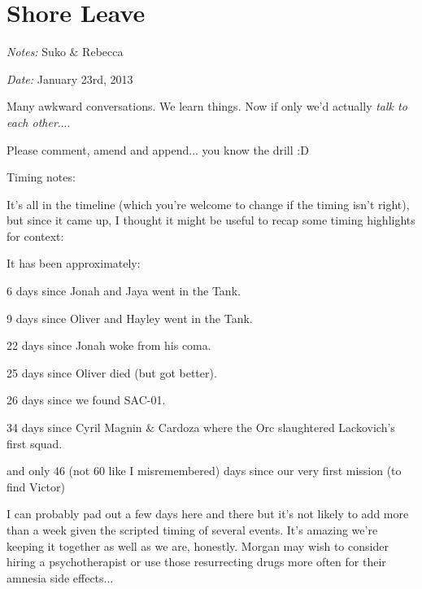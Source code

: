 \setcounter{chapter}{ 13 }
\chapter{\textbf{Shore Leave} }






\textit{Notes:} Suko \& Rebecca

\textit{Date:} January 23rd, 2013



Many awkward conversations.  We learn things.  Now if only we'd actually \textit{talk to each other}....



Please comment, amend and append... you know the drill :D



\noindent\hrulefill



 {\LARGE Timing notes: } 



It's all in the timeline (which you're welcome to change if the timing isn't right), but since it came up, I thought it might be useful to recap some timing highlights for context:



It has been approximately:

6 days since Jonah and Jaya went in the Tank.  

9 days since Oliver and Hayley went in the Tank.

22 days since Jonah woke from his coma.

25 days since Oliver died (but got better).

26 days since we found SAC-01.  

34 days since Cyril Magnin \& Cardoza where the Orc slaughtered Lackovich's first squad. 

and only 46 (not 60 like I misremembered) days since our very first mission (to find Victor)



I can probably pad out a few days here and there but it's not likely to add more than a week given the scripted timing of several events.  It's amazing we're keeping it together as well as we are, honestly.  Morgan may wish to consider hiring a psychotherapist or use those resurrecting drugs more often for their amnesia side effects...



\noindent\hrulefill





